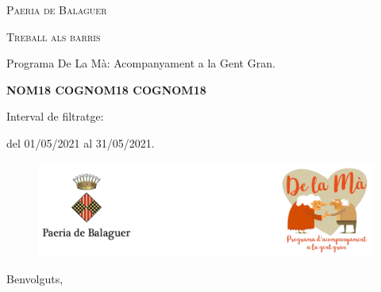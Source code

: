 \documentclass[a4paper,12pt]{elsarticle}  %
\begin{document}
 	


\begin{titlepage}
	\centering

	{\scshape\LARGE Paeria de Balaguer \par}


			\vfill


	{\scshape\Large Treball als barris\par}

	
			\vspace{0.5cm}

	
	{\Large Programa De La Mà: Acompanyament a la Gent Gran.\par}

			

			\vfill



	{\Large\bfseries NOM18 COGNOM18 COGNOM18 \par}
	


			\vfill



	{\large Interval de filtratge:\par}
	{\large del 01/05/2021 al 31/05/2021.\par}
		

\end{titlepage}



\clearpage







\FloatBarrier
\begin{figure}[h]
	\centering	
	\includegraphics[width=1\textwidth]{../IMATGES/logoPaeriaMa.png}
\end{figure}
\FloatBarrier	

\vfill









\noindent Benvolguts,

	\vspace{0.5cm}
\end{document}
